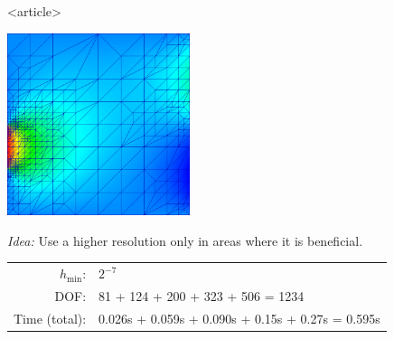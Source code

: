 \begin{frame}<article>
  \begin{center}

    \includegraphics[width=0.4\textwidth]{EPS/adaptivity/adaptivity5}

    \emph{Idea:} Use a higher resolution only in areas where it is beneficial.

    \begin{tabular*}{0.95\textwidth}{rl}
      $h_{\min}$:   & $2^{-7}$                                                  \\
      DOF:          & 81 + 124 + 200 + 323 + 506               = \alert{1234}   \\
      Time (total): & 0.026s + 0.059s + 0.090s + 0.15s + 0.27s = \alert{0.595s}
    \end{tabular*}

  \end{center}
\end{frame}

